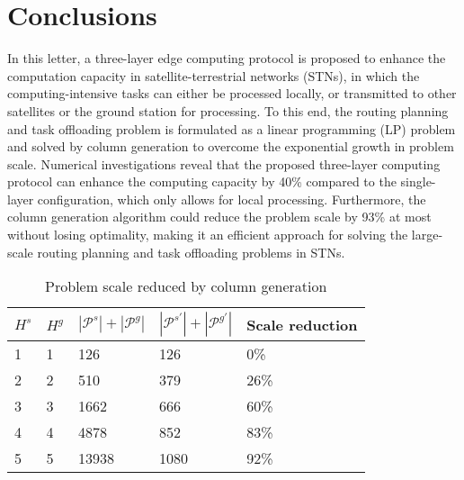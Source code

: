 \documentclass[journal,10pt]{IEEEtran}
\begin{document}
\section{Conclusions}
\label{Conclusion}

In this letter, a three-layer edge computing protocol is proposed to enhance the computation capacity in satellite-terrestrial networks (STNs), in which the computing-intensive tasks can either be processed locally, or transmitted to other satellites or the ground station for processing. To this end, the routing planning and task offloading problem is formulated as a linear programming (LP) problem and solved by column generation to overcome the exponential growth in problem scale. Numerical investigations reveal that the proposed three-layer computing protocol can enhance the computing capacity by 40\% compared to the single-layer configuration, which only allows for local processing. Furthermore, the column generation algorithm could reduce the problem scale by 93\% at most without losing optimality, making it an efficient approach for solving the large-scale routing planning and task offloading problems in STNs.

\begin{table}[!t]
\centering
\caption{Problem scale reduced by column generation}
\label{scale_reducation}
\begin{tabular}{|p{0.5 cm}|p{0.5 cm}|p{1.7 cm}|p{1.7 cm}|p{2 cm}|}
\hline
$H^s$ & $H^g$ &\textbf{$|\mathcal{P}^s| + |\mathcal{P}^g|$} & \textbf{$|\mathcal{P}^{s'}| + |\mathcal{P}^{g'}|$} & \textbf{Scale reduction} \\
\hline
1 & 1 & 126 & 126 & 0\% \\
2 & 2 & 510 & 379 & 26\% \\
3 & 3 & 1662 & 666 & 60\%\\
4 & 4 & 4878 & 852 & 83\%\\
5 & 5 & 13938 & 1080 & 92\%\\
\hline
\end{tabular}
\vspace{-0.4cm}
\end{table}



 
\end{document}
